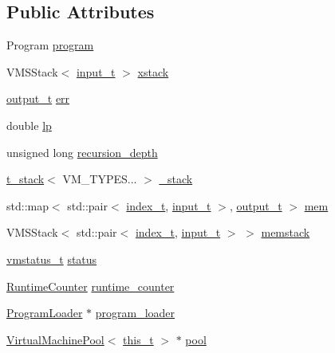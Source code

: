 \subsection*{Public Attributes}
\begin{DoxyCompactItemize}
\item 
Program \hyperlink{class_virtual_machine_state_aa9204cc7523092fdc3d3e53e881bc841}{program}
\item 
V\+M\+S\+Stack$<$ \hyperlink{class_virtual_machine_state_aeb5e01ec57466fd3734e0c29f2b8da0a}{input\+\_\+t} $>$ \hyperlink{class_virtual_machine_state_aded245a367f3caca62faf7264feaff41}{xstack}
\item 
\hyperlink{class_virtual_machine_state_a1015cee5061f82f82ef6a953b51f9bd5}{output\+\_\+t} \hyperlink{class_virtual_machine_state_aa3eaa4b1432d1604b86039d2ff0faae1}{err}
\item 
double \hyperlink{class_virtual_machine_state_a5937b2c3afdfe35b9bba71dbdd83d5bd}{lp}
\item 
unsigned long \hyperlink{class_virtual_machine_state_aa35593f67d1ea4e838fec8e7a8d33897}{recursion\+\_\+depth}
\item 
\hyperlink{struct_virtual_machine_state_1_1t__stack}{t\+\_\+stack}$<$ V\+M\+\_\+\+T\+Y\+P\+E\+S... $>$ \hyperlink{class_virtual_machine_state_a55e2a8e32597a15740e9e38ae539200c}{\+\_\+stack}
\item 
std\+::map$<$ std\+::pair$<$ \hyperlink{class_virtual_machine_state_a95ba2f54f65b778c8a012ea3e7a0ee50}{index\+\_\+t}, \hyperlink{class_virtual_machine_state_aeb5e01ec57466fd3734e0c29f2b8da0a}{input\+\_\+t} $>$, \hyperlink{class_virtual_machine_state_a1015cee5061f82f82ef6a953b51f9bd5}{output\+\_\+t} $>$ \hyperlink{class_virtual_machine_state_a8f36d4040b98a1e85fb7edf61e6085c9}{mem}
\item 
V\+M\+S\+Stack$<$ std\+::pair$<$ \hyperlink{class_virtual_machine_state_a95ba2f54f65b778c8a012ea3e7a0ee50}{index\+\_\+t}, \hyperlink{class_virtual_machine_state_aeb5e01ec57466fd3734e0c29f2b8da0a}{input\+\_\+t} $>$ $>$ \hyperlink{class_virtual_machine_state_a27df19177ca8ede5d88bf51cff785c00}{memstack}
\item 
\hyperlink{_v_m_status_8h_a6202215407ab29590bb936ca2996cf64}{vmstatus\+\_\+t} \hyperlink{class_virtual_machine_state_a6e561a217081654b4187620953e86fff}{status}
\item 
\hyperlink{class_runtime_counter}{Runtime\+Counter} \hyperlink{class_virtual_machine_state_ad62a688573c8c8187b25731a417e57ac}{runtime\+\_\+counter}
\item 
\hyperlink{class_program_loader}{Program\+Loader} $\ast$ \hyperlink{class_virtual_machine_state_ada020ee6e13cbda67c9dfed264f7fc3f}{program\+\_\+loader}
\item 
\hyperlink{class_virtual_machine_pool}{Virtual\+Machine\+Pool}$<$ \hyperlink{class_virtual_machine_state_ada0e1bebef2d73581c6adcd55f8be521}{this\+\_\+t} $>$ $\ast$ \hyperlink{class_virtual_machine_state_a68860cf7a2971d7f8c4b817d360d7b43}{pool}
\end{DoxyCompactItemize}
